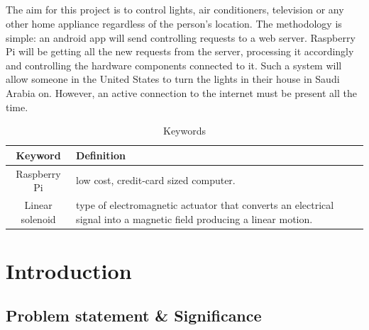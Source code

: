 \documentclass[a4paper, 12pt, oneside]{book}
\newcommand\boldcolor[1]{\textcolor{bold}{\textbf{#1}}}
\begin{document}
		\paragraph{} The aim for this project is to control lights, air conditioners, television or any other home appliance regardless of the person's location. The methodology is simple: an android app will send controlling requests to a web server. Raspberry Pi will be getting all the new requests from the server, processing it accordingly and controlling the hardware components connected to it. Such a system will allow someone in the United States to turn the lights in their house in Saudi Arabia on. However, an active connection to the internet must be present all the time.
		\def\arraystretch{1.5}
		\begin{table}[H]
			\caption{Keywords}
			\begin{center}
				\begin{tabularx}{\linewidth}{|c|X|}\hline		
					\boldcolor{Keyword} & \boldcolor{Definition} \\\hline
					Raspberry Pi & low cost, credit-card sized computer\cite{raspberry}. \\\hline
					Linear solenoid &  type of electromagnetic actuator that converts an electrical signal into a magnetic field producing a linear motion\cite{linear}.\\\hline				
				\end{tabularx}
			\end{center}
		\end{table}
	

	\chapter{Introduction}
		\section{Problem statement \& Significance}
\end{document}
